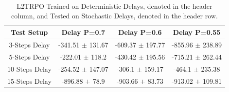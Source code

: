             \begin{table}[!b]
                \centering
                \caption{L2TRPO Trained on Deterministic Delays, denoted in the header column, and Tested on Deterministic Delays, denoted in the header row.}
            \end{table}
            
            \begin{table}[!b]
                \centering
                \begin{tabular}{@{}cccc@{}}
                \toprule
                \multicolumn{1}{c}{Test Setup} & Delay P=0.7           & Delay P=0.6          & Delay P=0.55         \\ \midrule
                3-Steps Delay                  & -341.51 $\pm$ 131.67  & -609.37 $\pm$ 197.77 & -855.96 $\pm$ 238.89 \\
                5-Steps Delay                  & -222.01 $\pm$ 118.2   & -430.42 $\pm$ 195.56 & -715.21 $\pm$ 262.44 \\
                10-Steps Delay                 & -254.52 $\pm$ 147.07  & -306.1  $\pm$ 159.17 & -464.1  $\pm$ 235.38 \\
                15-Steps Delay                 & -896.88 $\pm$ 78.9    & -903.66 $\pm$ 83.73  & -913.02 $\pm$ 109.81 \\ \bottomrule
                \end{tabular}
                \centering
                \caption{L2TRPO Trained on Deterministic Delays, denoted in the header column, and Tested on Stochastic Delays, denoted in the header row.}
            \end{table}
            
